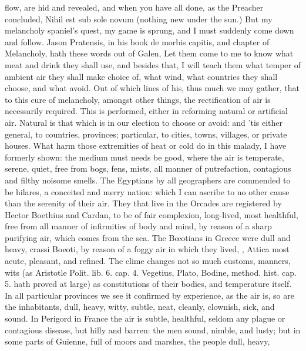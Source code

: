 {flow, are hid and revealed, and when you have all done, as the Preacher
concluded, Nihil est sub sole novum (nothing new under the sun.) But my
melancholy spaniel's quest, my game is sprung, and I must suddenly come
down and follow.
Jason Pratensis, in his book de morbis capitis, and chapter of
Melancholy, hath these words out of Galen, Let them come to me to
know what meat and drink they shall use, and besides that, I will teach
them what temper of ambient air they shall make choice of, what wind,
what countries they shall choose, and what avoid. Out of which lines of
his, thus much we may gather, that to this cure of melancholy, amongst
other things, the rectification of air is necessarily required. This is
performed, either in reforming natural or artificial air. Natural is
that which is in our election to choose or avoid: and 'tis either
general, to countries, provinces; particular, to cities, towns,
villages, or private houses. What harm those extremities of heat or
cold do in this malady, I have formerly shown: the medium must needs be
good, where the air is temperate, serene, quiet, free from bogs, fens,
mists, all manner of putrefaction, contagious and filthy noisome
smells. The Egyptians by all geographers are commended to be
hilares, a conceited and merry nation: which I can ascribe to no other
cause than the serenity of their air. They that live in the Orcades are
registered by Hector Boethius and Cardan, to be of fair
complexion, long-lived, most healthful, free from all manner of
infirmities of body and mind, by reason of a sharp purifying air, which
comes from the sea. The B\oe{}otians in Greece were dull and heavy, crassi
Boeoti, by reason of a foggy air in which they lived, , Attica most acute, pleasant, and refined.
The clime changes not so much customs, manners, wits (as Aristotle
Polit. lib. 6. cap. 4. Vegetius, Plato, Bodine, method. hist. cap. 5.
hath proved at large) as constitutions of their bodies, and temperature
itself. In all particular provinces we see it confirmed by experience,
as the air is, so are the inhabitants, dull, heavy, witty, subtle,
neat, cleanly, clownish, sick, and sound. In Perigord in France
the air is subtle, healthful, seldom any plague or contagious disease,
but hilly and barren: the men sound, nimble, and lusty; but in some
parts of Guienne, full of moors and marshes, the people dull, heavy,
}

